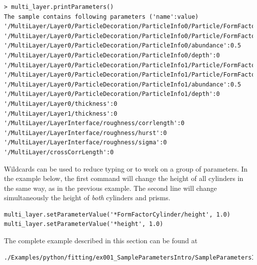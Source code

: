 \begin{lstlisting}[language=shell, style=commandline]
> multi_layer.printParameters()
The sample contains following parameters ('name':value)
'/MultiLayer/Layer0/ParticleDecoration/ParticleInfo0/Particle/FormFactorCylinder/height':5
'/MultiLayer/Layer0/ParticleDecoration/ParticleInfo0/Particle/FormFactorCylinder/radius':5
'/MultiLayer/Layer0/ParticleDecoration/ParticleInfo0/abundance':0.5
'/MultiLayer/Layer0/ParticleDecoration/ParticleInfo0/depth':0
'/MultiLayer/Layer0/ParticleDecoration/ParticleInfo1/Particle/FormFactorPrism3/half_side':5
'/MultiLayer/Layer0/ParticleDecoration/ParticleInfo1/Particle/FormFactorPrism3/height':5
'/MultiLayer/Layer0/ParticleDecoration/ParticleInfo1/abundance':0.5
'/MultiLayer/Layer0/ParticleDecoration/ParticleInfo1/depth':0
'/MultiLayer/Layer0/thickness':0
'/MultiLayer/Layer1/thickness':0
'/MultiLayer/LayerInterface/roughness/corrlength':0
'/MultiLayer/LayerInterface/roughness/hurst':0
'/MultiLayer/LayerInterface/roughness/sigma':0
'/MultiLayer/crossCorrLength':0
\end{lstlisting}

Wildcards  can be used to reduce typing or to work on a group
of parameters. In the example below, the first command will change the
height of all cylinders in the same way, as in the previous example. The second line will change simultaneously the height of {\it both} cylinders and prisms.
\begin{lstlisting}[language=shell, style=commandline]
multi_layer.setParameterValue('*FormFactorCylinder/height', 1.0)
multi_layer.setParameterValue('*height', 1.0)
\end{lstlisting}

The complete example described in this section can be found at 
\begin{lstlisting}[language=shell, style=commandline]
./Examples/python/fitting/ex001_SampleParametersIntro/SampleParametersIntro.py
\end{lstlisting}





